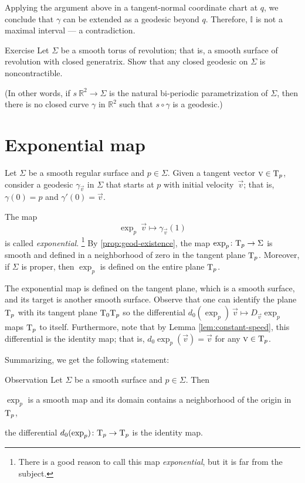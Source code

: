 Applying the argument above in a tangent-normal coordinate chart at $q$, we conclude that $\gamma$ can be extended as a geodesic beyond $q$.
Therefore, $\mathbb{I}$ is not a maximal interval --- a contradiction.
\qeds

\begin{thm}{Exercise}\label{ex:round-torus}
Let $\Sigma$ be a smooth torus of revolution; that is,
a smooth surface of revolution with closed generatrix.
Show that any closed geodesic on $\Sigma$ is noncontractible.

(In other words, if $s\:\mathbb{R}^2\to \Sigma$ is the natural bi-periodic parametrization of $\Sigma$, then
there is no closed curve $\gamma$ in $\mathbb{R}^2$ such that $s\circ\gamma$ is a geodesic.)
\end{thm}


\section{Exponential map}\label{sec:exp}

Let $\Sigma$ be a smooth regular surface and $p\in \Sigma$.
Given a tangent vector ${\text{\sc{v}}}\in \mathrm{T}_p$, consider a geodesic $\gamma_{\vec v}$ in $\Sigma$ that starts at $p$ with initial velocity~$\vec v$; 
that is, $\gamma(0)=p$ and $\gamma'(0)={\vec v}$.

The map 
\[\exp_p\:\vec v\mapsto \gamma_{\vec v}(1)\]
is called \emph{exponential}.%
\footnote{There is a good reason to call this map {}\emph{exponential}, but it is far from the subject.}
By \ref{prop:geod-existence}, the map $\exp_p\colon\mathrm{T}_p\to \Sigma$ is smooth and defined in a neighborhood of zero in the tangent plane $\mathrm{T}_p$.
Moreover, if $\Sigma$ is proper, then $\exp_p$ is defined on the entire plane $\mathrm{T}_p$.

The exponential map
is defined on the tangent plane, which is a smooth surface,
and its target is another smooth surface.
Observe that one can identify the plane $\mathrm{T}_p$
with its tangent plane $\mathrm{T}_0\mathrm{T}_p$ so the differential $d_0(\exp_p)\:\vec v\mapsto D_{\vec v}\exp_p$ maps $\mathrm{T}_p$ to itself.
Furthermore, note that by Lemma \ref{lem:constant-speed}, this differential is the identity map; that is, $d_0\exp_p(\vec v)=
\vec v$ for any $\text{\sc{v}}\in \mathrm{T}_p$.

Summarizing, we get the following statement:

\begin{thm}{Observation}\label{obs:d(exp)=1}
Let $\Sigma$ be a smooth surface and $p\in \Sigma$.
Then 
\begin{subthm}{}
$\exp_p$ is a smooth map and its domain contains a neighborhood of the origin in $\mathrm{T}_p$, 
\end{subthm}

\begin{subthm}{}
the differential $d_0(\exp_p)\colon\mathrm{T}_p\to \mathrm{T}_p$ is the identity map.
\end{subthm}

\end{thm}

